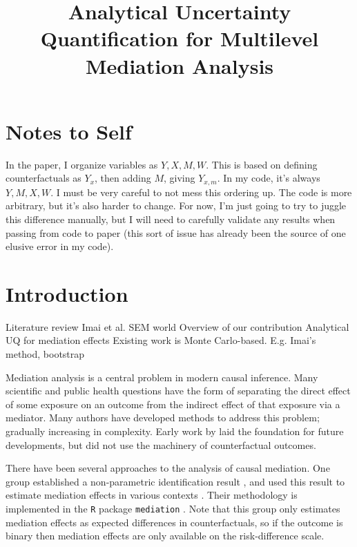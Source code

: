 \documentclass{article}
\title{Analytical Uncertainty Quantification for Multilevel Mediation Analysis}
\begin{document}
\maketitle
\section{Notes to Self}
\begin{outline}
    \1 In the paper, I organize variables as $Y, X, M, W$. This is based on defining counterfactuals as $Y_x$, then adding $M$, giving $Y_{x, m}$. In my code, it's always $Y, M, X, W$. I must be very careful to not mess this ordering up. The code is more arbitrary, but it's also harder to change. For now, I'm just going to try to juggle this difference manually, but I will need to carefully validate any results when passing from code to paper (this sort of issue has already been the source of one elusive error in my code).
\end{outline}



\section{Introduction}



\begin{outline}
    \1 Literature review
        \2 \citeauthor{Sam23}
        \2 Imai et al.
        \2 SEM world
    \1 Overview of our contribution
        \2 Analytical UQ for mediation effects
        \2 Existing work is Monte Carlo-based. E.g. Imai's method, bootstrap
\end{outline}

Mediation analysis is a central problem in modern causal inference. Many scientific and public health questions have the form of separating the direct effect of some exposure on an outcome from the indirect effect of that exposure via a mediator. Many authors have developed methods to address this problem; gradually increasing in complexity. Early work by \citet{Bar86} laid the foundation for future developments, but did not use the machinery of counterfactual outcomes. 

There have been several approaches to the analysis of causal mediation. One group established a non-parametric identification result \citep{Ima10II}, and used this result to estimate mediation effects in various contexts \citep{Ima10I, Ima11}. Their methodology is implemented in the \texttt{R} package \texttt{mediation} \citep{Tin14}. Note that this group only estimates mediation effects as expected differences in counterfactuals, so if the outcome is binary then mediation effects are only available on the risk-difference scale.
\end{document}
